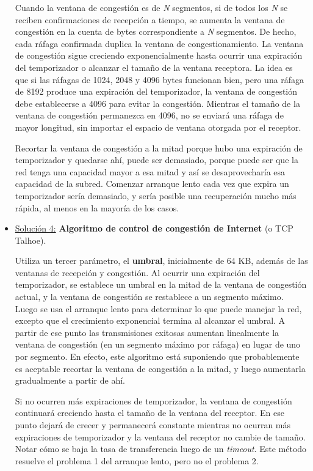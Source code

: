 \documentclass[10pt,a4paper]{report}
\begin{document}
\begin{itemize}
	\par Cuando la ventana de congestión es de \textit{N} segmentos, si de todos los \textit{N} se reciben confirmaciones de recepción a tiempo, se aumenta la ventana de congestión en la cuenta de bytes correspondiente a \textit{N} segmentos. De hecho, cada ráfaga confirmada duplica la ventana de congestionamiento. La ventana de congestión sigue creciendo exponencialmente hasta ocurrir una expiración del temporizador o alcanzar el tamaño de la ventana receptora. La idea es que si las ráfagas de 1024, 2048 y 4096 bytes funcionan bien, pero una ráfaga de 8192 produce una expiración del temporizador, la ventana de congestión debe establecerse a 4096 para evitar la congestión. Mientras el tamaño de la ventana de congestión permanezca en 4096, no se enviará una ráfaga de mayor longitud, sin importar el espacio de ventana otorgada por el receptor.

	\par Recortar la ventana de congestión a la mitad porque hubo una expiración de temporizador y quedarse ahí, puede ser demasiado, porque puede ser que la red tenga una capacidad mayor a esa mitad y así se desaprovecharía esa capacidad de la subred. Comenzar arranque lento cada vez que expira un temporizador sería demasiado, y sería posible una recuperación mucho más rápida, al menos en la mayoría de los casos.

	\item \underline{Solución 4:} \textbf{Algoritmo de control de congestión de Internet} (o TCP Talhoe).
	
		\par Utiliza un tercer parámetro, el \textbf{umbral}, inicialmente de 64 KB, además de las ventanas de recepción y congestión. Al ocurrir una expiración del temporizador, se establece un umbral en la mitad de la ventana de congestión actual, y la ventana de congestión se restablece a un segmento máximo. Luego se usa el arranque lento para determinar lo que puede manejar la red, excepto que el crecimiento exponencial termina al alcanzar el umbral. A partir de ese punto las transmisiones exitosas aumentan linealmente la ventana de congestión (en un segmento máximo por ráfaga) en lugar de uno por segmento. En efecto, este algoritmo está suponiendo que probablemente es aceptable recortar la ventana de congestión a la mitad, y luego aumentarla gradualmente a partir de ahí.

	\par Si no ocurren más expiraciones de temporizador, la ventana de congestión continuará creciendo hasta el tamaño de la ventana del receptor. En ese punto dejará de crecer y permanecerá constante mientras no ocurran más expiraciones de temporizador y la ventana del receptor no cambie de tamaño. Notar cómo se baja la tasa de transferencia luego de un \textit{timeout}. Este método resuelve el problema 1 del arranque lento, pero no el problema 2.


\end{itemize}
\end{document}
